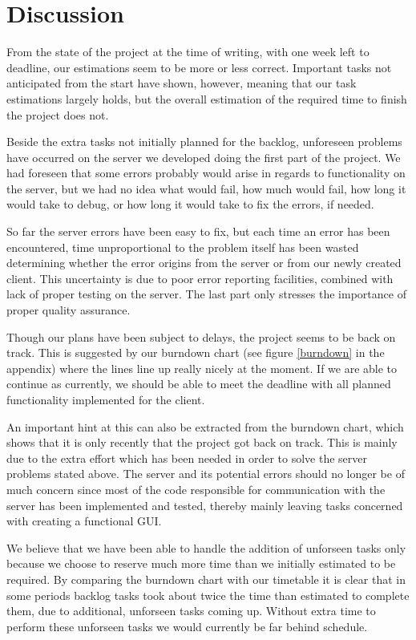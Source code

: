 \section{Discussion}
From the state of the project at the time of writing, with one week left to deadline, our estimations seem to be more or less correct. Important tasks not anticipated from the start have shown, however, meaning that our task estimations largely holds, but the overall estimation of the required time to finish the project does not.

Beside the extra tasks not initially planned for the backlog, unforeseen problems have occurred on the server we developed doing the first part of the project. We had foreseen that some errors probably would arise in regards to functionality on the server, but we had no idea what would fail, how much would fail, how long it would take to debug, or how long it would take to fix the errors, if needed.

So far the server errors have been easy to fix, but each time an error has been encountered, time unproportional to the problem itself has been wasted determining whether the error origins from the server or from our newly created client.
This uncertainty is due to poor error reporting facilities, combined with lack of proper testing on the server. The last part only stresses the importance of proper quality assurance.

Though our plans have been subject to delays, the project seems to be back on track. This is suggested by our burndown chart (see figure \ref{burndown} in the appendix) where the lines line up really nicely at the moment. If we are able to continue as currently, we should be able to meet the deadline with all planned functionality implemented for the client.

An important hint at this can also be extracted from the burndown chart, which shows that it is only recently that the project got back on track. This is mainly due to the extra effort which has been needed in order to solve the server problems stated above.
The server and its potential errors should no longer be of much concern since most of the code responsible for communication with the server has been implemented and tested, thereby mainly leaving tasks concerned with creating a functional GUI.

We believe that we have been able to handle the addition of unforseen tasks only because we choose to reserve much more time than we initially estimated to be required. By comparing
the burndown chart with our timetable it is clear that in some periods backlog tasks took about twice the time than estimated to complete them, due to additional, unforseen tasks coming up. Without extra time to perform these unforseen tasks we would currently be far behind schedule.

